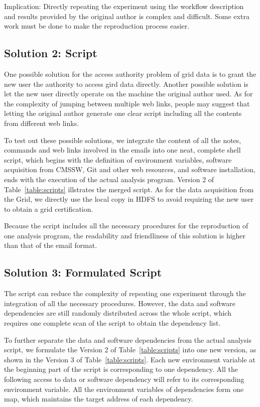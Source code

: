 \documentclass{acm_proc_article-sp}
\begin{document}
Implication: Directly repeating the experiment using the workflow description and results provided by the original author is complex and difficult. Some extra work must be done to make the reproduction process easier.

\subsection{Solution 2: Script}
One possible solution for the access authority problem of grid data is to grant the new user the authority to access gird data directly. Another possible solution is let the new user directly operate on the machine the original author used. As for the complexity of jumping between multiple web links, people may suggest that letting the original author generate one clear script including all the contents from different web links.

To test out these possible solutions, we integrate the content of all the notes, commands and web links involved in the emails into one neat, complete shell script, which begins with the definition of environment variables, software acquisition from CMSSW, Git and other web resources, and software installation, ends with the execution of the actual analysis program. Version 2 of Table~\ref{table:scripts} illstrates the merged script. As for the data acquisition from the Grid, we directly use the local copy in HDFS to avoid requiring the new user to obtain a grid certification.



Because the script includes all the necessary procedures for the reproduction
of one analysis program, the readability and friendliness of this solution is
higher than that of the email format. 


\subsection{Solution 3: Formulated Script}

The script can reduce the complexity of repeating one experiment through the integration of all the necessary procedures. However, the data and software dependencies are still randomly distributed across the whole script, which requires one complete scan of the script to obtain the  dependency list. 

To further separate the data and software dependencies from the actual analysis
script, we formulate the Version 2 of Table~\ref{table:scripts}  into one new version, as shown in
the Version 3 of Table~\ref{table:scripts}. Each new environment variable at the beginning part of
the script is corresponding to one dependency. All the following access to data
or software dependency will refer to its corresponding environment variable.
All the environment variables of dependencies form one map, which maintains the
target address of each dependency.
\end{document}
